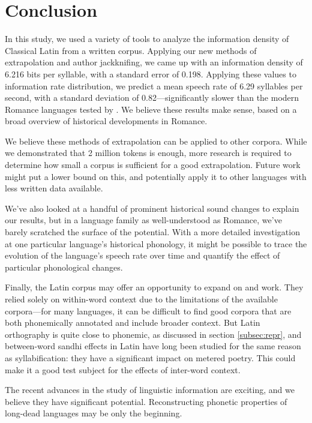 \documentclass[12pt,twoside]{article}
\begin{document}
\section{Conclusion}
\label{sec:concl}

In this study, we used a variety of tools to analyze the information density of Classical Latin from a written corpus. Applying our new methods of extrapolation and author jackknifing, we came up with an information density of 6.216 bits per syllable, with a standard error of 0.198. Applying these values to  information rate distribution, we predict a mean speech rate of 6.29 syllables per second, with a standard deviation of 0.82---significantly slower than the modern Romance languages tested by \citeauthor{coupé}. We believe these results make sense, based on a broad overview of historical developments in Romance.

We believe these methods of extrapolation can be applied to other corpora. While we demonstrated that 2 million tokens is enough, more research is required to determine how small a corpus is sufficient for a good extrapolation. Future work might put a lower bound on this, and potentially apply it to other languages with less written data available.

We've also looked at a handful of prominent historical sound changes to explain our results, but in a language family as well-understood as Romance, we've barely scratched the surface of the potential. With a more detailed investigation at one particular language's historical phonology, it might be possible to trace the evolution of the language's speech rate over time and quantify the effect of particular phonological changes.

Finally, the Latin corpus may offer an opportunity to expand on \citet{oh} and  work. They relied solely on within-word context due to the limitations of the available corpora---for many languages, it can be difficult to find good corpora that are both phonemically annotated and include broader context. But Latin orthography is quite close to phonemic, as discussed in section \ref{subsec:repr}, and between-word sandhi effects in Latin have long been studied for the same reason as syllabification: they have a significant impact on metered poetry. This could make it a good test subject for the effects of inter-word context.

The recent advances in the study of linguistic information are exciting, and we believe they have significant potential. Reconstructing phonetic properties of long-dead languages may be only the beginning.
\end{document}
